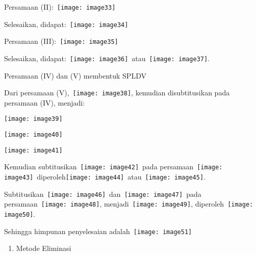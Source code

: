 \documentclass[11pt,fleqn]{book} %
\begin{document}
\noindent Persamaan (II):~\texttt{[image: image33]}

\noindent Selesaikan, didapat:~\texttt{[image: image34]}

\noindent Persamaan (III):~\texttt{[image: image35]}

\noindent Selesaikan, didapat:~\texttt{[image: image36]}~atau~\texttt{[image: image37]}.

\noindent Persamaan (IV) dan (V) membentuk SPLDV

\noindent Dari persamaan (V),~\texttt{[image: image38]}, kemudian disubtitusikan pada persamaan (IV), menjadi:

\noindent \texttt{[image: image39]}

\noindent \texttt{[image: image40]}

\noindent \texttt{[image: image41]}

\noindent Kemudian subtitusikan~\texttt{[image: image42]}~pada persamaan~\texttt{[image: image43]}~diperoleh\texttt{[image: image44]}~atau~\texttt{[image: image45]}.

\noindent Subtitusikan~\texttt{[image: image46]}~dan~\texttt{[image: image47]}~pada persamaan~\texttt{[image: image48]}, menjadi~\texttt{[image: image49]}, diperoleh~\texttt{[image: image50]}.

\noindent Sehingga himpunan penyelesaian adalah~\texttt{[image: image51]}

\begin{enumerate}
\item  Metode Eliminasi
\end{enumerate}
\end{document}
